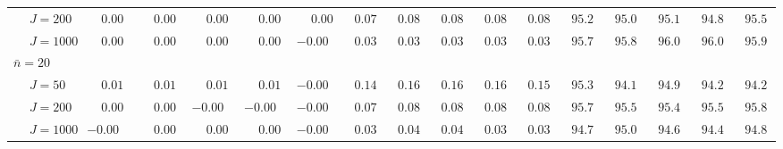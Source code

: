 \begin{sidewaystable}
\begin{threeparttable}
\begin{tabular}{llccccccccccccccc}
 & \nopagebreak $\;J=200$  & $\phantom{-}0.00\phantom{0}$ & $\phantom{-}0.00\phantom{0}$ & $\phantom{-}0.00\phantom{0}$ & $\phantom{-}0.00\phantom{0}$ & $\phantom{-}0.00\phantom{0}$ & $\phantom{0}0.07\phantom{0}$ & $\phantom{0}0.08\phantom{0}$ & $\phantom{0}0.08\phantom{0}$ & $\phantom{0}0.08\phantom{0}$ & $\phantom{0}0.08\phantom{0}$ & $\phantom{0}95.2\phantom{0}$ & $\phantom{0}95.0\phantom{0}$ & $\phantom{0}95.1\phantom{0}$ & $\phantom{0}94.8\phantom{0}$ & $\phantom{0}95.5\phantom{0}$ \\
 & \nopagebreak $\;J=1000$  & $\phantom{-}0.00\phantom{0}$ & $\phantom{-}0.00\phantom{0}$ & $\phantom{-}0.00\phantom{0}$ & $\phantom{-}0.00\phantom{0}$ & ${-}0.00\phantom{0}$ & $\phantom{0}0.03\phantom{0}$ & $\phantom{0}0.03\phantom{0}$ & $\phantom{0}0.03\phantom{0}$ & $\phantom{0}0.03\phantom{0}$ & $\phantom{0}0.03\phantom{0}$ & $\phantom{0}95.7\phantom{0}$ & $\phantom{0}95.8\phantom{0}$ & $\phantom{0}96.0\phantom{0}$ & $\phantom{0}96.0\phantom{0}$ & $\phantom{0}95.9\phantom{0}$ \\
\multicolumn{4}{l}{$\bar{n}=20$} \\  & \nopagebreak $\;J=50$  & $\phantom{-}0.01\phantom{0}$ & $\phantom{-}0.01\phantom{0}$ & $\phantom{-}0.01\phantom{0}$ & $\phantom{-}0.01\phantom{0}$ & ${-}0.00\phantom{0}$ & $\phantom{0}0.14\phantom{0}$ & $\phantom{0}0.16\phantom{0}$ & $\phantom{0}0.16\phantom{0}$ & $\phantom{0}0.16\phantom{0}$ & $\phantom{0}0.15\phantom{0}$ & $\phantom{0}95.3\phantom{0}$ & $\phantom{0}94.1\phantom{0}$ & $\phantom{0}94.9\phantom{0}$ & $\phantom{0}94.2\phantom{0}$ & $\phantom{0}94.2\phantom{0}$ \\
 & \nopagebreak $\;J=200$  & $\phantom{-}0.00\phantom{0}$ & $\phantom{-}0.00\phantom{0}$ & ${-}0.00\phantom{0}$ & ${-}0.00\phantom{0}$ & ${-}0.00\phantom{0}$ & $\phantom{0}0.07\phantom{0}$ & $\phantom{0}0.08\phantom{0}$ & $\phantom{0}0.08\phantom{0}$ & $\phantom{0}0.08\phantom{0}$ & $\phantom{0}0.08\phantom{0}$ & $\phantom{0}95.7\phantom{0}$ & $\phantom{0}95.5\phantom{0}$ & $\phantom{0}95.4\phantom{0}$ & $\phantom{0}95.5\phantom{0}$ & $\phantom{0}95.8\phantom{0}$ \\
 & \nopagebreak $\;J=1000$  & ${-}0.00\phantom{0}$ & $\phantom{-}0.00\phantom{0}$ & $\phantom{-}0.00\phantom{0}$ & $\phantom{-}0.00\phantom{0}$ & ${-}0.00\phantom{0}$ & $\phantom{0}0.03\phantom{0}$ & $\phantom{0}0.04\phantom{0}$ & $\phantom{0}0.04\phantom{0}$ & $\phantom{0}0.03\phantom{0}$ & $\phantom{0}0.03\phantom{0}$ & $\phantom{0}94.7\phantom{0}$ & $\phantom{0}95.0\phantom{0}$ & $\phantom{0}94.6\phantom{0}$ & $\phantom{0}94.4\phantom{0}$ & $\phantom{0}94.8\phantom{0}$ \\

\end{tabular}
\end{threeparttable}
\end{sidewaystable}
